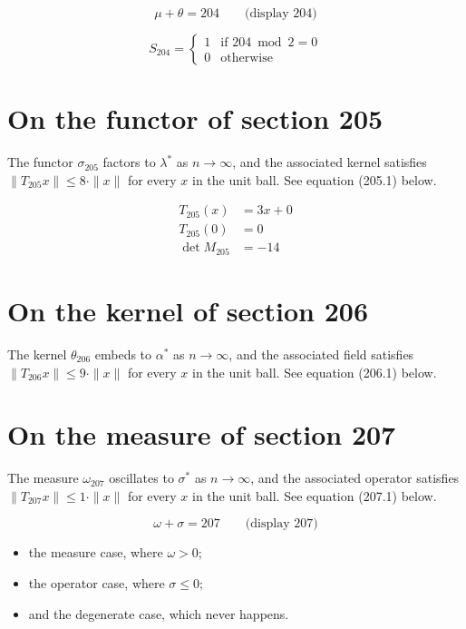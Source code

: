 \documentclass{article}
\begin{document}
$$
\mu + \theta = 204 \qquad \text{(display 204)}
$$

\begin{equation}
S_{204} = \begin{cases} 1 & \text{if } 204 \bmod 2 = 0 \\ 0 & \text{otherwise} \end{cases}
\end{equation}

\section{On the functor of section 205}
The functor $\sigma_{205}$ factors to $\lambda^{*}$ as $n \to \infty$,
and the associated kernel satisfies $\|T_{205} x\| \leq 8 \cdot \|x\|$
for every $x$ in the unit ball. See equation (205.1) below.

\begin{align}
T_{205}(x) &= 3 x + 0 \\
T_{205}(0) &= 0 \\
\det M_{205} &= -14
\end{align}

\section{On the kernel of section 206}
The kernel $\theta_{206}$ embeds to $\alpha^{*}$ as $n \to \infty$,
and the associated field satisfies $\|T_{206} x\| \leq 9 \cdot \|x\|$
for every $x$ in the unit ball. See equation (206.1) below.

\section{On the measure of section 207}
The measure $\omega_{207}$ oscillates to $\sigma^{*}$ as $n \to \infty$,
and the associated operator satisfies $\|T_{207} x\| \leq 1 \cdot \|x\|$
for every $x$ in the unit ball. See equation (207.1) below.

$$
\omega + \sigma = 207 \qquad \text{(display 207)}
$$

\begin{itemize}
  \item the measure case, where $\omega > 0$;
  \item the operator case, where $\sigma \leq 0$;
  \item and the degenerate case, which never happens.
\end{itemize}
\end{document}
